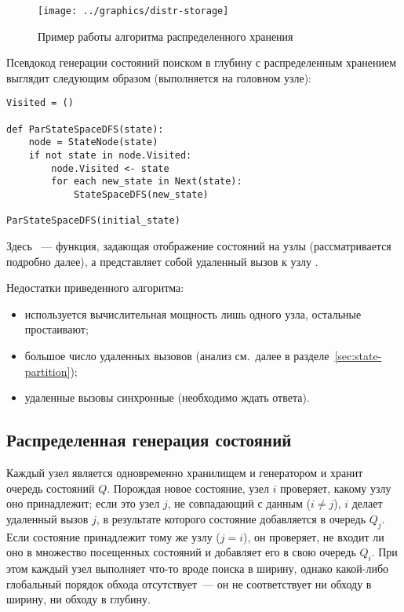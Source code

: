 \begin{figure}[!htb]
  \centering 
  \texttt{[image: ../graphics/distr-storage]}
  \caption{Пример работы алгоритма распределенного хранения}
  \label{fig:distr-storage}
\end{figure}

Псевдокод генерации состояний поиском в глубину с распределенным хранением выглядит
следующим образом (выполняется на головном узле):

\begin{lstlisting}[style=pseudocode]
Visited = ()

def ParStateSpaceDFS(state):
    node = StateNode(state)
    if not state in node.Visited:
        node.Visited <- state
        for each new_state in Next(state):
            StateSpaceDFS(new_state)

ParStateSpaceDFS(initial_state)
\end{lstlisting}

Здесь ~--- функция, задающая отображение состояний на узлы (рассматривается
подробно далее), а  представляет собой удаленный вызов к узлу
.

Недостатки приведенного алгоритма:
\begin{itemize}
\item используется вычислительная мощность лишь одного узла, остальные простаивают;
\item большое число удаленных вызовов (анализ см.~далее в
  разделе~\ref{sec:state-partition});
\item удаленные вызовы синхронные (необходимо ждать ответа).
\end{itemize}

\subsection{Распределенная генерация состояний}
\label{sec:distr-generation}

Каждый узел является одновременно хранилищем и генератором и хранит очередь состояний
$Q$. Порождая новое состояние, узел $i$ проверяет, какому узлу оно принадлежит; если это
узел $j$, не совпадающий с данным ($i \neq j$), $i$ делает удаленный вызов $j$, в
результате которого состояние добавляется в очередь $Q_j$. Если состояние принадлежит тому
же узлу ($j = i$), он проверяет, не входит ли оно в множество посещенных состояний
 и добавляет его в свою очередь $Q_i$. При этом каждый узел выполняет что-то
вроде поиска в ширину, однако какой-либо глобальный порядок обхода отсутствует~--- он не
соответствует ни обходу в ширину, ни обходу в глубину.

